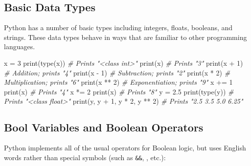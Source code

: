 \documentclass[
]{article}
\newenvironment{Shaded}{}{}
\newcommand{\BuiltInTok}[1]{#1}
\newcommand{\CommentTok}[1]{\textcolor[rgb]{0.38,0.63,0.69}{\textit{#1}}}
\newcommand{\DecValTok}[1]{\textcolor[rgb]{0.25,0.63,0.44}{#1}}
\newcommand{\FloatTok}[1]{\textcolor[rgb]{0.25,0.63,0.44}{#1}}
\newcommand{\NormalTok}[1]{#1}
\newcommand{\OperatorTok}[1]{\textcolor[rgb]{0.40,0.40,0.40}{#1}}
\begin{document}
\hypertarget{basic-data-types}{%
\subsection{Basic Data Types}\label{basic-data-types}}

Python has a number of basic types including integers, floats, booleans,
and strings. These data types behave in ways that are familiar to other
programming languages.

\begin{Shaded}
\begin{Highlighting}[]
\NormalTok{x }\OperatorTok{=} \DecValTok{3}
\BuiltInTok{print}\NormalTok{(}\BuiltInTok{type}\NormalTok{(x)) }\CommentTok{\# Prints "\textless{}class \textquotesingle{}int\textquotesingle{}\textgreater{}"}
\BuiltInTok{print}\NormalTok{(x)       }\CommentTok{\# Prints "3"}
\BuiltInTok{print}\NormalTok{(x }\OperatorTok{+} \DecValTok{1}\NormalTok{)   }\CommentTok{\# Addition; prints "4"}
\BuiltInTok{print}\NormalTok{(x }\OperatorTok{{-}} \DecValTok{1}\NormalTok{)   }\CommentTok{\# Subtraction; prints "2"}
\BuiltInTok{print}\NormalTok{(x }\OperatorTok{*} \DecValTok{2}\NormalTok{)   }\CommentTok{\# Multiplication; prints "6"}
\BuiltInTok{print}\NormalTok{(x }\OperatorTok{**} \DecValTok{2}\NormalTok{)  }\CommentTok{\# Exponentiation; prints "9"}
\NormalTok{x }\OperatorTok{+=} \DecValTok{1}
\BuiltInTok{print}\NormalTok{(x)       }\CommentTok{\# Prints "4"}
\NormalTok{x }\OperatorTok{*=} \DecValTok{2}
\BuiltInTok{print}\NormalTok{(x)       }\CommentTok{\# Prints "8"}
\NormalTok{y }\OperatorTok{=} \FloatTok{2.5}
\BuiltInTok{print}\NormalTok{(}\BuiltInTok{type}\NormalTok{(y))                 }\CommentTok{\# Prints "\textless{}class \textquotesingle{}float\textquotesingle{}\textgreater{}"}
\BuiltInTok{print}\NormalTok{(y, y }\OperatorTok{+} \DecValTok{1}\NormalTok{, y }\OperatorTok{*} \DecValTok{2}\NormalTok{, y }\OperatorTok{**} \DecValTok{2}\NormalTok{) }\CommentTok{\# Prints "2.5 3.5 5.0 6.25"}
\end{Highlighting}
\end{Shaded}

\hypertarget{bool-variables-and-boolean-operators}{%
\subsection{Bool Variables and Boolean
Operators}\label{bool-variables-and-boolean-operators}}

Python implements all of the usual operators for Boolean logic, but uses
English words rather than special symbols (such as \texttt{\&\&},
\texttt{\textbar{}\textbar{}}, etc.):
\end{document}
